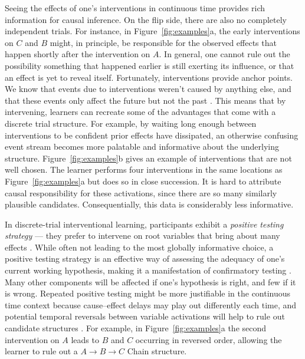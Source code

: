 \documentclass[10pt,letterpaper]{article}
\begin{document}
Seeing the effects of one's interventions in continuous time provides rich information for causal inference. On the flip side, there are also no completely independent trials. 
For instance, in Figure~\ref{fig:examples}a, the early interventions on $C$ and $B$ might, in principle, be responsible for the observed effects that happen shortly after the intervention on $A$.  In general, one cannot rule out the possibility something that happened earlier is still exerting its influence, or that an effect is yet to reveal itself.  Fortunately, interventions provide anchor points. We know that events due to interventions weren't caused by anything else, and that these events only affect the future but not the past \citep{lagnado2004advantage}. 
This means that by intervening, learners can recreate some of the advantages that come with a discrete trial structure.  
For example, by waiting long enough between interventions to be confident prior effects have dissipated, an otherwise confusing event stream becomes more palatable and informative about the underlying structure. 
Figure~\ref{fig:examples}b gives an example of interventions 
that are not well chosen.  The learner performs four interventions in the same locations as Figure~\ref{fig:examples}a but does so in close succession. It is hard to attribute causal responsibility for these activations, since there are so many similarly plausible candidates. Consequentially, this data is considerably less informative.

In discrete-trial interventional learning, participants exhibit a \emph{positive testing strategy} --- they prefer to intervene on root variables that bring about many effects \citep{coenen2015strategies}.  While often not leading to the most globally informative choice, a positive testing strategy is an effective way of assessing the adequacy of one's current working hypothesis, making it a manifestation of confirmatory testing \citep{nickerson1998confirmation}.  Many other components will be affected if one's hypothesis is right, and few if it is wrong.  Repeated positive testing might be more justifiable in the continuous time context because cause--effect delays may play out differently each time, and potential temporal reversals between variable activations will help to rule out candidate structures \citep{bramley2014order}. 
For example, in Figure~\ref{fig:examples}a the second intervention on $A$ leads to $B$ and $C$ occurring in reversed order, allowing the learner to rule out a $A\rightarrow B\rightarrow C$ Chain structure.
\end{document}
